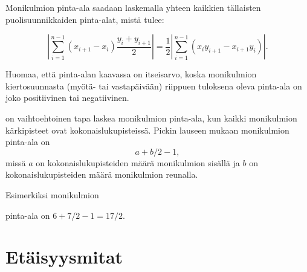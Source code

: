 Monikulmion pinta-ala saadaan laskemalla yhteen kaikkien
tällaisten puolisuunnikkaiden pinta-alat, mistä tulee:

\[|\sum_{i=1}^{n-1} (x_{i+1}-x_{i}) \frac{y_i+y_{i+1}}{2}| =
\frac{1}{2} |\sum_{i=1}^{n-1} (x_i y_{i+1} - x_{i+1} y_i)|.\]

Huomaa, että pinta-alan kaavassa on itseisarvo,
koska monikulmion kiertosuunnasta (myötä- tai vastapäivään)
riippuen tuloksena oleva pinta-ala on joko
positiivinen tai negatiivinen.


 on vaihtoehtoinen tapa laskea
monikulmion pinta-ala,
kun kaikki monikulmion kärkipisteet
ovat kokonaislukupisteissä.
Pickin lauseen mukaan monikulmion pinta-ala on
\[ a + b/2 -1,\]
missä $a$ on kokonaislukupisteiden määrä monikulmion sisällä
ja $b$ on kokonaislukupisteiden määrä monikulmion reunalla.

Esimerkiksi monikulmion
\begin{center}
\end{center}
pinta-ala on $6+7/2-1=17/2$.

\section{Etäisyysmitat}


